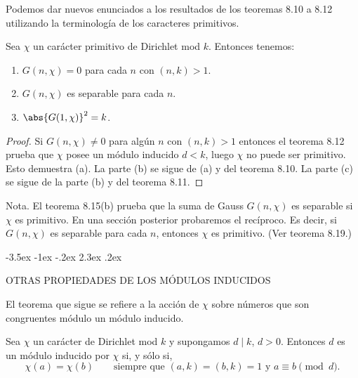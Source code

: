 \documentclass[12pt,a4paper]{book}
\makeatletter
\renewcommand\section{\@startsection{section}{1}{\z@}%
  {-3.5ex \@plus -1ex \@minus -.2ex}%
  {2.3ex \@plus .2ex}%
  {\normalfont\Large\bfseries\raggedright}}
\makeatother
\begin{document}
    Podemos dar nuevos enunciados a los resultados de los teoremas 8.10 a 8.12 utilizando la
    terminología de los caracteres primitivos.

    \begin{teorema}
        Sea $\chi$ un carácter primitivo de Dirichlet mod $k$. Entonces tenemos:
        \begin{enumerate}
            \item[(a)] $G(n,\chi)=0$ para cada $n$ con $(n,k)>1$.
            \item[(b)] $G(n,\chi)$ es separable para cada $n$.
            \item[(c)] $\abs{G(1,\chi)}^{2}=k$.
        \end{enumerate}
    \end{teorema}

    \begin{proof}
        Si $G(n,\chi)\neq0$ para algún $n$ con $(n,k)>1$ entonces el teorema 8.12 prueba que
        $\chi$ posee un módulo inducido $d<k$, luego $\chi$ no puede ser primitivo. Esto
        demuestra (a). La parte (b) se sigue de (a) y del teorema 8.10. La parte (c) se
        sigue de la parte (b) y del teorema 8.11.
    \end{proof}

    Nota. El teorema 8.15(b) prueba que la suma de Gauss $G(n,\chi)$ es separable si $\chi$
    es primitivo. En una sección posterior probaremos el recíproco. Es decir, si $G(n,\chi)$
    es separable para cada $n$, entonces $\chi$ es primitivo. (Ver teorema 8.19.)

    \section{OTRAS PROPIEDADES DE LOS MÓDULOS INDUCIDOS}

    El teorema que sigue se refiere a la acción de $\chi$ sobre números que son congruentes
    módulo un módulo inducido.

    \begin{teorema}
        Sea $\chi$ un carácter de Dirichlet mod $k$ y supongamos $d\mid k$, $d>0$. Entonces
        $d$ es un módulo inducido por $\chi$ si, y sólo si,
        \begin{equation}\label{eq:8-16}
            \chi(a)=\chi(b)\qquad\text{siempre que }(a,k)=(b,k)=1\text{ y }a\equiv b\pmod{d}.
        \end{equation}
    \end{teorema}
\end{document}
